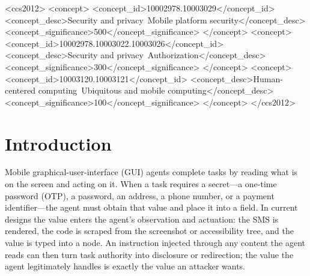 \documentclass[sigconf,10pt]{acmart}
\theoremstyle{acmplain}%
\begin{document}
\begin{CCSXML}
<ccs2012>
   <concept>
       <concept_id>10002978.10003029</concept_id>
       <concept_desc>Security and privacy~Mobile platform security</concept_desc>
       <concept_significance>500</concept_significance>
   </concept>
   <concept>
       <concept_id>10002978.10003022.10003026</concept_id>
       <concept_desc>Security and privacy~Authorization</concept_desc>
       <concept_significance>300</concept_significance>
   </concept>
   <concept>
       <concept_id>10003120.10003121</concept_id>
       <concept_desc>Human-centered computing~Ubiquitous and mobile computing</concept_desc>
       <concept_significance>100</concept_significance>
   </concept>
</ccs2012>
\end{CCSXML}



\maketitle

\section{Introduction}
\label{sec:intro}

Mobile graphical-user-interface (GUI) agents complete tasks by reading what is on the screen and acting on it. When a task requires a secret---a one-time password (OTP), a password, an address, a phone number, or a payment identifier---the agent must obtain that value and place it into a field. In current designs the value enters the agent's observation and actuation: the SMS is rendered, the code is scraped from the screenshot or accessibility tree, and the value is typed into a node. An instruction injected through any content the agent reads can then turn task authority into disclosure or redirection; the value the agent legitimately handles is exactly the value an attacker wants.
\end{document}
